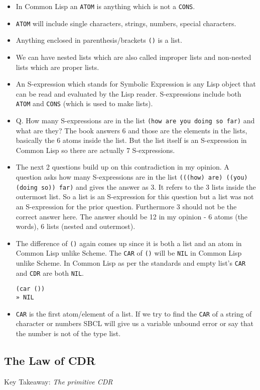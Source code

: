 \documentclass[11pt]{article}
\begin{document}
\begin{itemize}
\item In Common Lisp an \texttt{ATOM} is anything which is not a \texttt{CONS}.
\item \texttt{ATOM} will include single characters, strings, numbers, special characters.
\item Anything enclosed in parenthesis/brackets \texttt{()} is a list.
\item We can have nested lists which are also called improper lists and non-nested lists which are proper lists.
\item An S-expression which stands for Symbolic Expression is any Lisp object that can be read and evaluated by the
Lisp reader. S-expressions include both \texttt{ATOM} and \texttt{CONS} (which is used to make lists).
\item Q. How many S-expressions are in the list \texttt{(how are you doing so far)} and what are they? The book answers 6 and
those are the elements in the lists, basically the 6 atoms inside the list. But the list itself is an S-expression
in Common Lisp so there are actually 7 S-expressions.
\item The next 2 questions build up on this contradiction in my opinion. A question asks how many S-expressions are in the
list \texttt{(((how) are) ((you) (doing so)) far)} and gives the answer as 3. It refers to the 3 lists inside the outermost
list. So a list is an S-expression for this question but a list was not an S-expression for the prior question.
Furthermore 3 should not be the correct answer here. The answer should be 12 in my opinion - 6 atoms (the words),
6 lists (nested and outermost).
\item The difference of \texttt{()} again comes up since it is both a list and an atom in Common Lisp unlike Scheme. The \texttt{CAR}
of \texttt{()} will be \texttt{NIL} in Common Lisp unlike Scheme. In Common Lisp as per the standards and empty list's \texttt{CAR} and
\texttt{CDR} are both \texttt{NIL}.
\begin{verbatim}
(car ())
» NIL
\end{verbatim}
\item \texttt{CAR} is the first atom/element of a list. If we try to find the \texttt{CAR} of a string of character or numbers SBCL will
give us a variable unbound error or say that the number is not of the type list.
\end{itemize}


\subsection{The Law of CDR}
\label{sec:org5bf61a5}
Key Takeaway:
\emph{The primitive CDR}
\end{document}
